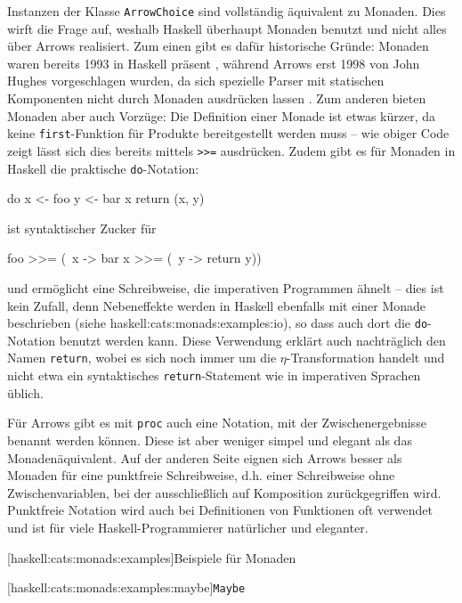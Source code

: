 \documentclass[12pt, a4paper, bibgerm]{scrbook}
\newenvironment{DIFnomarkup}{}{}
\newcommand\icode[1]{\lstinline?#1?}
\newcommand\lsubsubsection{}
\newcommand\lparagraph{}
\newcommand\sref{}
\begin{document}
Instanzen der Klasse \icode{ArrowChoice} sind vollständig äquivalent zu
Monaden.  Dies wirft die Frage auf, weshalb Haskell überhaupt Monaden
benutzt und nicht alles über Arrows realisiert. Zum einen gibt es dafür
historische Gründe: Monaden waren bereits 1993 in Haskell präsent
\cite[S.23ff]{HaskellHistory}, während Arrows erst 1998 von John Hughes
vorgeschlagen wurden, da sich spezielle Parser mit statischen
Komponenten nicht durch Monaden ausdrücken lassen \cite{Hughes}. Zum
anderen bieten Monaden aber auch Vorzüge: Die Definition einer Monade
ist etwas kürzer, da keine \icode{first}-Funktion für Produkte
bereitgestellt werden muss -- wie obiger Code zeigt lässt sich dies
bereits mittels \icode{>>=} %
ausdrücken. Zudem gibt es für Monaden in Haskell die praktische
\icode{do}-Notation:
\begin{DIFnomarkup}\begin{code}
do x <- foo
   y <- bar x
   return (x, y)
\end{code}\end{DIFnomarkup}
ist syntaktischer Zucker für
\begin{DIFnomarkup}\begin{code}
foo >>= (\ x ->
  bar x >>= (\ y ->
    return y))
\end{code}\end{DIFnomarkup} %
und ermöglicht eine Schreibweise, die imperativen Programmen ähnelt --
dies ist kein Zufall, denn Nebeneffekte werden in Haskell ebenfalls mit
einer Monade beschrieben (siehe \sref{haskell:cats:monads:examples:io}),
so dass auch dort die \icode{do}-Notation benutzt werden kann. Diese
Verwendung erklärt auch nachträglich den Namen \icode{return}, wobei es
sich noch immer um die $\eta$-Transformation handelt und nicht etwa ein
syntaktisches \icode{return}-Statement wie in imperativen Sprachen
üblich.

Für Arrows gibt es mit \icode{proc} auch eine Notation, mit der
Zwischenergebnisse benannt werden können. Diese ist aber weniger simpel
und elegant als das Monadenäquivalent. Auf der anderen Seite eignen sich
Arrows besser als Monaden für eine punktfreie Schreibweise, d.h. einer
Schreibweise ohne Zwischenvariablen, bei der ausschließlich auf
Komposition zurückgegriffen wird. Punktfreie Notation wird auch bei
Definitionen von Funktionen oft verwendet und ist für viele
Haskell-Programmierer natürlicher und eleganter.

\lsubsubsection[haskell:cats:monads:examples]{Beispiele für Monaden}

\lparagraph[haskell:cats:monads:examples:maybe]{\icode{Maybe}}
\end{document}
